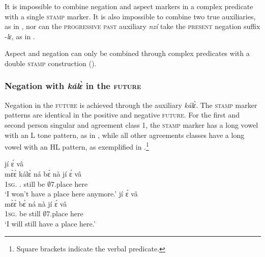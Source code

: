It is impossible to combine negation and aspect markers in a complex predicate with a single \textsc{stamp} marker. It is also impossible to combine two true auxiliaries, as in , nor can the \textsc{progressive past} auxiliary {\itshape nzí} take the \textsc{present} negation suffix -{\itshape lɛ}, as in .

\ea\label{pale5}
\z
\z

\noindent Aspect and negation can only be combined through complex predicates with a double \textsc{stamp} construction ().









\subsubsection{Negation with {\itshape kálɛ̀} in the \textsc{future}}
\label{sec:NEGFUT}

Negation in the \textsc{future} is achieved through the auxiliary {\itshape kálɛ̀}. The \textsc{stamp} marker patterns are identical in the positive and negative \textsc{future}. For the first and second person singular and agreement class 1, the \textsc{stamp} marker has a long vowel with an L tone pattern, as in , while all other agreements classes have a long vowel with an HL pattern, as exemplified in .\footnote{Square brackets indicate the verbal predicate.}

\ea\label{kale1}
\ea \label{kale1a}
   jí ɛ́ vâ \\
        {\db}mɛ̀ɛ̀ kálɛ̀ ná bɛ̀ nà jí ɛ́ vâ \\
           {\db}1\textsc{sg}.{\FUT} {\NEG}.{\FUT} still be {\COM} $\emptyset$7.place {\LOC} here\\
    \trans `I won't have a place here anymore.'
\ex\label{kale1b}
  \glll  [{\bfseries mɛ̀ɛ̀} bɛ̀ ná nà] jí ɛ́ vâ \\
        {\db}mɛ̀ɛ̀ bɛ̀ ná nà jí ɛ́ vâ \\
           {\db}1\textsc{sg}.{\FUT} be still {\COM} $\emptyset$7.place {\LOC} here\\
    \trans `I will still have a place here.'
\z
\z


